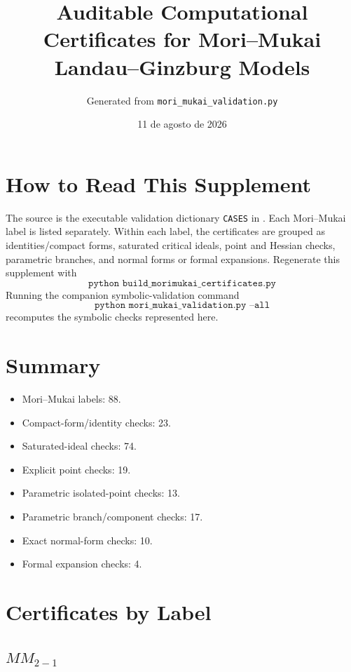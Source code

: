\documentclass[10pt,a4paper]{article}
\title{Auditable Computational Certificates for Mori--Mukai Landau--Ginzburg Models}
\author{Generated from \texttt{mori\_mukai\_validation.py}}
\date{11 de agosto de 2026}
\begin{document}
\maketitle

\section*{How to Read This Supplement}
The source is the executable validation dictionary \texttt{CASES} in
. Each Mori--Mukai label is listed separately.
Within each label, the certificates are grouped as identities/compact forms, saturated critical ideals,
point and Hessian checks, parametric branches, and normal forms or formal expansions.  Regenerate this
supplement with
\[
\texttt{python build\_morimukai\_certificates.py}
\]
Running the companion symbolic-validation command
\[
\texttt{python mori\_mukai\_validation.py --all}
\]
recomputes the symbolic checks represented here.

\section*{Summary}
\begin{itemize}
\item Mori--Mukai labels: 88.
\item Compact-form/identity checks: 23.
\item Saturated-ideal checks: 74.
\item Explicit point checks: 19.
\item Parametric isolated-point checks: 13.
\item Parametric branch/component checks: 17.
\item Exact normal-form checks: 10.
\item Formal expansion checks: 4.
\end{itemize}

\section*{Certificates by Label}
\subsection*{$ MM_{2-1} $}
\end{document}
